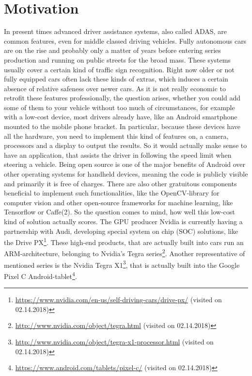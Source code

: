 
\chapter{Motivation}\label{chapter:motivation}
In present times advanced driver assistance systems, also called ADAS, are common features, even for middle classed driving vehicles. Fully autonomous cars are on the rise and probably only a matter of years before entering series production and running on public streets for the broad mass. These systems usually cover a certain kind of traffic sign recognition. Right now older or not fully equipped cars often lack these kinds of extras, which induces a certain absence of relative safeness over newer cars. As it is not really economic to retrofit these features professionally, the question arises, whether you could add some of them to your vehicle without too much of circumstances, for example with a low-cost device, most drivers already have, like an Android smartphone mounted to the mobile phone bracket. In particular, because these devices have all the hardware, you need to implement this kind of features on, a camera, processors and a display to output the results. So it would actually make sense to have an application, that assists the driver in following the speed limit when steering a vehicle. \newline
Being open source is one of the major benefits of Android over other operating systems for handheld devices, meaning the code is publicly visible and primarily it is free of charges. There are also other gratuitous components beneficial to implement such functionalities, like the OpenCV-library for computer vision and other open-source frameworks for machine learning, like Tensorflow or Caffe(2). So the question comes to mind, how well this low-cost kind of solution actually scores.\newline
The GPU producer Nvidia is currently having a partnership with Audi, developing special system on chip (SOC) solutions, like the Drive PX\footnote{\url{https://www.nvidia.com/en-us/self-driving-cars/drive-px/} (visited on 02.14.2018)}. These high-end products, that are actually built into cars run an ARM-architecture,  belonging to Nvidia's Tegra series\footnote{\url{http://www.nvidia.com/object/tegra.html} (visited on 02.14.2018)}. Another representative of mentioned series is the Nvidia Tegra X1\footnote{\url{http://www.nvidia.com/object/tegra-x1-processor.html} (visited on 02.14.2018)}, that is actually built into the Google Pixel C Android-tablet\footnote{\url{https://www.android.com/tablets/pixel-c/} (visited on 02.14.2018)}. 
